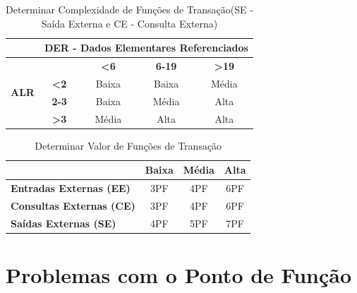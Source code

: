 \begin{table}[H]
\centering
\caption{Determinar Complexidade de Funções de Transação(SE - Saída Externa  e CE - Consulta Externa)}
\label{funcoesdetransacao2}
\begin{tabular}{|c|c|c|c|c|}
\hline
                              & \multicolumn{4}{c|}{\textbf{DER - Dados Elementares Referenciados}}                    \\ \hline
\multirow{4}{*}{\textbf{ALR}} & \textbf{}              & \textbf{\textless6} & \textbf{6-19} & \textbf{\textgreater19} \\ \cline{2-5}
                              & \textbf{\textless2}    & Baixa               & Baixa         & Média                   \\ \cline{2-5}
                              & \textbf{2-3}           & Baixa               & Média         & Alta                    \\ \cline{2-5}
                              & \textbf{\textgreater3} & Média               & Alta          & Alta                    \\ \hline
\end{tabular}
\end{table}

\begin{table}[H]
\centering
\caption{Determinar Valor de Funções de Transação}
\label{my-label}
\begin{tabular}{|l|c|c|c|}
\hline
\textbf{}                                              & \multicolumn{1}{l|}{\textbf{Baixa}} & \multicolumn{1}{l|}{\textbf{Média}} & \multicolumn{1}{l|}{\textbf{Alta}} \\ \hline
\textbf{Entradas Externas (EE)}                        & 3PF                                 & 4PF                                 & 6PF                                \\ \hline
\multicolumn{1}{|c|}{\textbf{Consultas Externas (CE)}} & 3PF                                 & 4PF                                 & 6PF                                \\ \hline
\textbf{Saídas Externas (SE)}                          & 4PF                                 & 5PF                                 & 7PF                                \\ \hline
\end{tabular}
\end{table}



\section{Problemas com o Ponto de Função}

